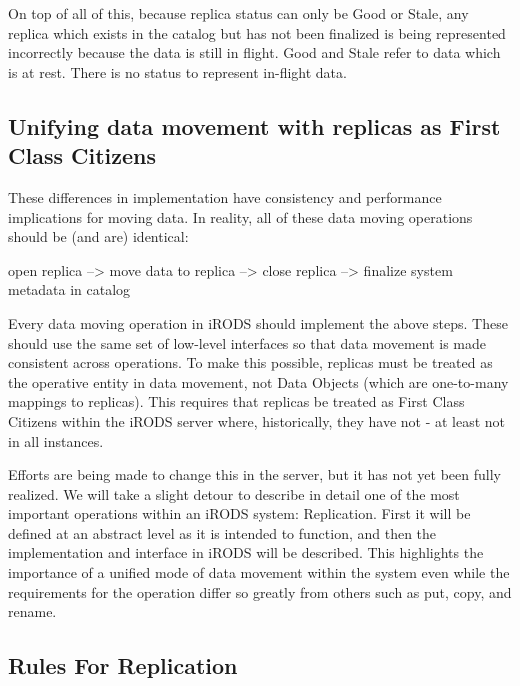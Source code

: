 \documentclass{irodsugm}
\begin{document}
On top of all of this, because replica status can only be Good or Stale, any replica which exists in the catalog but has not been finalized is being represented incorrectly because the data is still in flight. Good and Stale refer to data which is at rest. There is no status to represent in-flight data.

\subsection*{Unifying data movement with replicas as First Class Citizens}

These differences in implementation have consistency and performance implications for moving data. In reality, all of these data moving operations should be (and are) identical:

\begin{samepage}
\begin{center}
open replica --> move data to replica --> close replica --> finalize system metadata in catalog
\end{center}
\end{samepage}

Every data moving operation in iRODS should implement the above steps. These should use the same set of low-level interfaces so that data movement is made consistent across operations. To make this possible, replicas must be treated as the operative entity in data movement, not Data Objects (which are one-to-many mappings to replicas). This requires that replicas be treated as First Class Citizens within the iRODS server where, historically, they have not - at least not in all instances.

Efforts are being made to change this in the server, but it has not yet been fully realized. We will take a slight detour to describe in detail one of the most important operations within an iRODS system: Replication. First it will be defined at an abstract level as it is intended to function, and then the implementation and interface in iRODS will be described. This highlights the importance of a unified mode of data movement within the system even while the requirements for the operation differ so greatly from others such as put, copy, and rename.

\subsection*{Rules For Replication}
\end{document}
